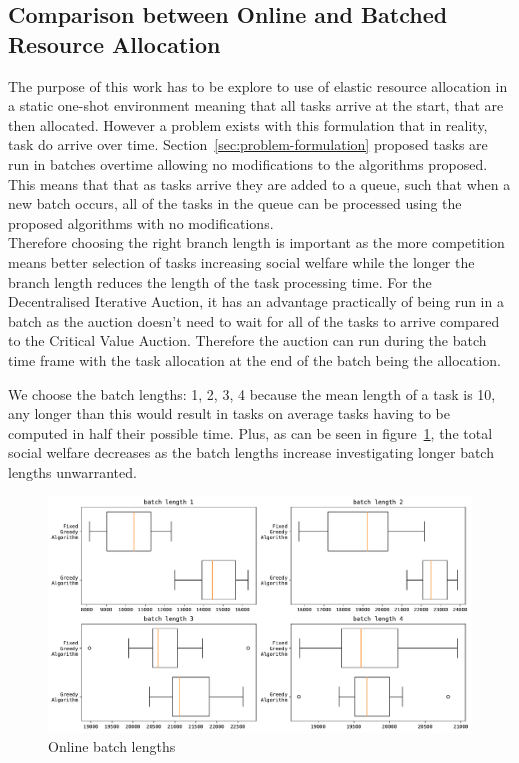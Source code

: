 \subsection{Comparison between Online and Batched Resource Allocation}
\label{subsec:comparison-between-online-and-batched-resource-allocation}
The purpose of this work has to be explore to use of elastic resource allocation in a static one-shot environment
meaning that all tasks arrive at the start, that are then allocated. However a problem exists with this formulation
that in reality, task do arrive over time. Section~\ref{sec:problem-formulation} proposed tasks are run in batches
overtime allowing no modifications to the algorithms proposed. This means that that as tasks arrive they are added to a
queue, such that when a new batch occurs, all of the tasks in the queue can be processed using the proposed algorithms
with no modifications. \\
Therefore choosing the right branch length is important as the more competition means better selection of tasks
increasing social welfare while the longer the branch length reduces the length of the task processing time. For the
Decentralised Iterative Auction, it has an advantage practically of being run in a batch as the auction doesn't need to
wait for all of the tasks to arrive compared to the Critical Value Auction. Therefore the auction can run during the
batch time frame with the task allocation at the end of the batch being the allocation.

We choose the batch lengths: 1, 2, 3, 4 because the mean length of a task is 10, any longer than this would result in
tasks on average tasks having to be computed in half their possible time. Plus, as can be seen in
figure~\ref{fig:batch-task-allocation}, the total social welfare decreases as the batch lengths increase investigating
longer batch lengths unwarranted.

\begin{figure}[h]
    \centering
    \includegraphics[width=\linewidth]{figs/online/online_batch_lengths.pdf}
    \caption{Online batch lengths}
    \label{fig:batch-task-allocation}
\end{figure}
